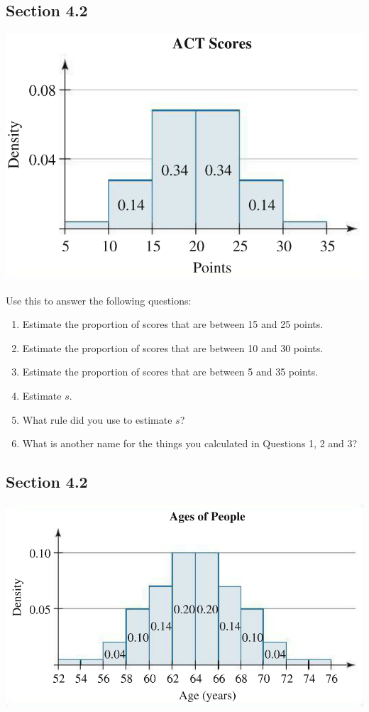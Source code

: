 \documentclass[12pt]{scrartcl}
\theoremstyle{definition}
\begin{document}
\subsection*{Section 4.2}
\begin{center}
	\includegraphics[scale=0.5]{RevSec42}
\end{center}
Use this to answer the following questions:
\begin{enumerate}
	\item Estimate the proportion of scores that are between 15 and 25 points.
	\item Estimate the proportion of scores that are between 10 and 30 points.
	\item Estimate the proportion of scores that are between 5 and 35 points.
	\item Estimate $s$.
	\item What rule did you use to estimate $s$? 
	\item What is another name for the things you calculated in Questions 1, 2 and 3?
\end{enumerate}

\subsection*{Section 4.2}
\begin{center}
	\includegraphics[scale=0.5]{RevSec421}
\end{center}
\end{document}
